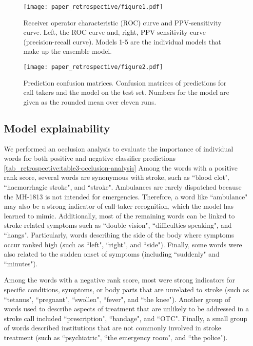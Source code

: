 {\begin{figure}[t]
    \centering
    \texttt{[image: paper\_retrospective/figure1.pdf]}
    \caption[Receiver operator characteristic (ROC) curve and PPV-sensitivity curve for stroke recognition.]{Receiver operator characteristic (ROC) curve and PPV-sensitivity curve. Left, the ROC curve and, right, PPV-sensitivity curve (precision-recall curve). Models 1-5 are the individual models that make up the ensemble model.}
    \label{fig_retrospective:figure1-roc-curve}
\end{figure}

\begin{figure}[t]
    \centering
    \texttt{[image: paper\_retrospective/figure2.pdf]}
    \caption[Prediction confusion matrices for stroke recognition.]{Prediction confusion matrices. Confusion matrices of predictions for call takers and the model on the test set. Numbers for the model are given as the rounded mean over eleven runs.}
    \label{fig_retrospective:figure2-prediction-confusion-matrices}
\end{figure}


\subsection{Model explainability}

We performed an occlusion analysis to evaluate the importance of individual words for both positive and negative classifier predictions \cref{tab_retrospective:table3-occlusion-analysis}
Among the words with a positive rank score, several words are synonymous with stroke, such as ``blood clot", ``haemorrhagic stroke", and ``stroke". Ambulances are rarely dispatched because the MH-1813 is not intended for emergencies. Therefore, a word like ``ambulance" may also be a strong indicator of call-taker recognition, which the model has learned to mimic. Additionally, most of the remaining words can be linked to stroke-related symptoms such as ``double vision", ``difficulties speaking", and ``hangs". Particularly, words describing the side of the body where symptoms occur ranked high (such as ``left", ``right", and ``side"). Finally, some words were also related to the sudden onset of symptoms (including ``suddenly" and ``minutes").

Among the words with a negative rank score, most were strong indicators for specific conditions, symptoms, or body parts that are unrelated to stroke (such as ``tetanus", ``pregnant", ``swollen", ``fever", and ``the knee"). Another group of words used to describe aspects of treatment that are unlikely to be addressed in a stroke call included ``prescription", ``bandage", and ``OTC". Finally, a small group of words described institutions that are not commonly involved in stroke treatment (such as ``psychiatric", ``the emergency room", and ``the police").

}
